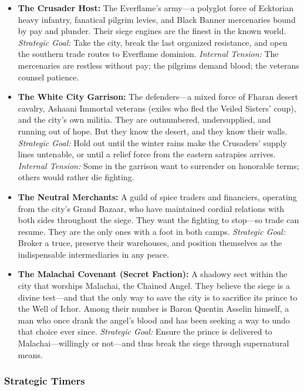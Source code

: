 \documentclass[11pt]{article}
\begin{document}
\begin{itemize}
    \item \textbf{The Crusader Host:} The Everflame's army—a polyglot force of Ecktorian heavy infantry, fanatical pilgrim levies, and Black Banner mercenaries bound by pay and plunder. Their siege engines are the finest in the known world. \textit{Strategic Goal:} Take the city, break the last organized resistance, and open the southern trade routes to Everflame dominion. \textit{Internal Tension:} The mercenaries are restless without pay; the pilgrims demand blood; the veterans counsel patience.
    \item \textbf{The White City Garrison:} The defenders—a mixed force of Fharan desert cavalry, Ashaani Immortal veterans (exiles who fled the Veiled Sisters' coup), and the city's own militia. They are outnumbered, undersupplied, and running out of hope. But they know the desert, and they know their walls. \textit{Strategic Goal:} Hold out until the winter rains make the Crusaders' supply lines untenable, or until a relief force from the eastern satrapies arrives. \textit{Internal Tension:} Some in the garrison want to surrender on honorable terms; others would rather die fighting.
    \item \textbf{The Neutral Merchants:} A guild of spice traders and financiers, operating from the city's Grand Bazaar, who have maintained cordial relations with both sides throughout the siege. They want the fighting to stop—so trade can resume. They are the only ones with a foot in both camps. \textit{Strategic Goal:} Broker a truce, preserve their warehouses, and position themselves as the indispensable intermediaries in any peace.
    \item \textbf{The Malachai Covenant (Secret Faction):} A shadowy sect within the city that worships Malachai, the Chained Angel. They believe the siege is a divine test—and that the only way to save the city is to sacrifice its prince to the Well of Ichor. Among their number is Baron Quentin Asselin himself, a man who once drank the angel's blood and has been seeking a way to undo that choice ever since. \textit{Strategic Goal:} Ensure the prince is delivered to Malachai—willingly or not—and thus break the siege through supernatural means.
\end{itemize}

\subsubsection{Strategic Timers}
\end{document}
